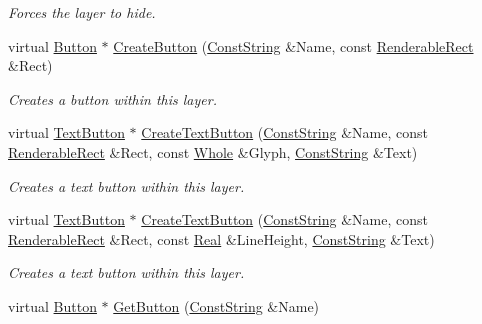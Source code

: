 \begin{DoxyCompactItemize}
\begin{DoxyCompactList}\small\item\em Forces the layer to hide. \item\end{DoxyCompactList}\item 
virtual \hyperlink{classphys_1_1UI_1_1Button}{Button} $\ast$ \hyperlink{classphys_1_1UI_1_1Layer_a3ccff67009451eb1468d78a52edcbccf}{CreateButton} (\hyperlink{namespacephys_a5ce5049f8b4bf88d6413c47b504ebb31}{ConstString} \&Name, const \hyperlink{structphys_1_1UI_1_1RenderableRect}{RenderableRect} \&Rect)
\begin{DoxyCompactList}\small\item\em Creates a button within this layer. \item\end{DoxyCompactList}\item 
virtual \hyperlink{classphys_1_1UI_1_1TextButton}{TextButton} $\ast$ \hyperlink{classphys_1_1UI_1_1Layer_a4a6246485351ecc9db995c749dc18f13}{CreateTextButton} (\hyperlink{namespacephys_a5ce5049f8b4bf88d6413c47b504ebb31}{ConstString} \&Name, const \hyperlink{structphys_1_1UI_1_1RenderableRect}{RenderableRect} \&Rect, const \hyperlink{namespacephys_a460f6bc24c8dd347b05e0366ae34f34a}{Whole} \&Glyph, \hyperlink{namespacephys_a5ce5049f8b4bf88d6413c47b504ebb31}{ConstString} \&Text)
\begin{DoxyCompactList}\small\item\em Creates a text button within this layer. \item\end{DoxyCompactList}\item 
virtual \hyperlink{classphys_1_1UI_1_1TextButton}{TextButton} $\ast$ \hyperlink{classphys_1_1UI_1_1Layer_ad2c0cfc59e34aeda647a7659b4522e55}{CreateTextButton} (\hyperlink{namespacephys_a5ce5049f8b4bf88d6413c47b504ebb31}{ConstString} \&Name, const \hyperlink{structphys_1_1UI_1_1RenderableRect}{RenderableRect} \&Rect, const \hyperlink{namespacephys_af7eb897198d265b8e868f45240230d5f}{Real} \&LineHeight, \hyperlink{namespacephys_a5ce5049f8b4bf88d6413c47b504ebb31}{ConstString} \&Text)
\begin{DoxyCompactList}\small\item\em Creates a text button within this layer. \item\end{DoxyCompactList}\item 
virtual \hyperlink{classphys_1_1UI_1_1Button}{Button} $\ast$ \hyperlink{classphys_1_1UI_1_1Layer_a6331e3e7a049deba36aba957d0dcecd8}{GetButton} (\hyperlink{namespacephys_a5ce5049f8b4bf88d6413c47b504ebb31}{ConstString} \&Name)

\end{DoxyCompactItemize}
